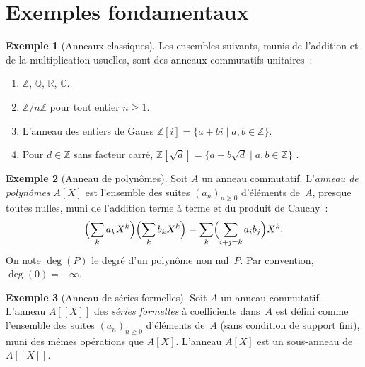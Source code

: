 \documentclass[12pt,a4paper,openany]{book}
\theoremstyle{definition}
\newtheorem{exemple}{Exemple}[chapter]
\newcommand{\Z}{\mathbb{Z}}
\newcommand{\Q}{\mathbb{Q}}
\newcommand{\R}{\mathbb{R}}
\newcommand{\C}{\mathbb{C}}
\begin{document}
\section{Exemples fondamentaux}\label{sec:exemples-anneaux}

\begin{exemple}[Anneaux classiques]\label{ex:anneaux-classiques}
Les ensembles suivants, munis de l'addition et de la multiplication
usuelles, sont des anneaux commutatifs unitaires~:
\begin{enumerate}[label=\textup{(\alph*)}]
  \item $\Z$\index{$\Z$}, $\Q$\index{$\Q$}, $\R$\index{$\R$},
        $\C$\index{$\C$}.
  \item $\Z/n\Z$\index{$\Z/n\Z$} pour tout entier $n \geqslant 1$.
  \item L'anneau des entiers de Gauss
        $\Z[i] = \{a + bi \mid a, b \in \Z\}$.
  \item Pour $d \in \Z$ sans facteur carré,
        $\Z[\sqrt{d}] = \{a + b\sqrt{d} \mid a, b \in \Z\}$%
        \index{$\Z[\sqrt{d}]$}.
\end{enumerate}
\end{exemple}

\begin{exemple}[Anneau de polynômes]\label{ex:anneau-polynomes}
Soit $A$ un anneau commutatif. L'\emph{anneau de polynômes}
$A[X]$ est l'ensemble des suites $(a_n)_{n \geqslant 0}$
d'éléments de~$A$, presque toutes nulles, muni de l'addition terme à
terme et du produit de Cauchy~:
\[
  \Bigl(\sum_{k} a_k X^k\Bigr)\Bigl(\sum_{k} b_k X^k\Bigr)
  = \sum_{k} \Bigl(\sum_{i+j=k} a_i b_j\Bigr) X^k.
\]
On note $\deg(P)$ le degré d'un polynôme
non nul~$P$. Par convention, $\deg(0) = -\infty$.
\end{exemple}

\begin{exemple}[Anneau de séries formelles]\label{ex:series-formelles}
Soit $A$ un anneau commutatif. L'anneau $A[[X]]$ des
\emph{séries formelles} à coefficients dans~$A$ est défini comme
l'ensemble des suites $(a_n)_{n \geqslant 0}$ d'éléments de~$A$
(sans condition de support fini), muni des mêmes opérations que $A[X]$.
L'anneau $A[X]$ est un sous-anneau de $A[[X]]$.
\end{exemple}
\end{document}
